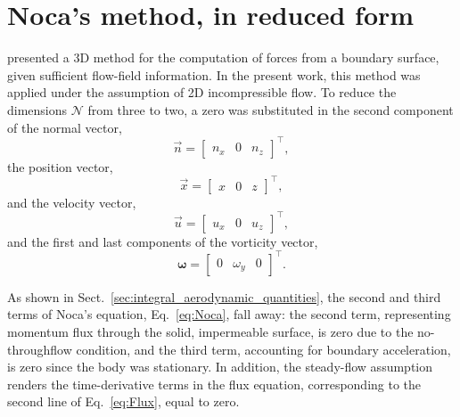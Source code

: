\documentclass[wes, manuscript]{copernicus}
\begin{document}
%
%
\appendix
%
\section{Noca's method, in reduced form}\label{sec:appendix_2D_Noca}
%
\appendixfigures
\appendixtables
%
\cite{Noca1999} presented a 3D method for the computation of forces from a boundary surface, given sufficient flow-field information. In the present work, this method was applied under the assumption of 2D incompressible flow. To reduce the dimensions $\mathscr{N}$ from three to two, a zero was substituted in the second component of the normal vector,
\begin{equation}
\vec{n} = \begin{bmatrix} n_{{x}} & 0 & n_{z} \end{bmatrix}^{\top},
\end{equation}
the position vector,
\begin{equation}
\vec{x} = \begin{bmatrix} x & 0 & z \end{bmatrix}^{\top},
\end{equation}
and the velocity vector,
\begin{equation}
\vec{u} = \begin{bmatrix} u_{{x}} & 0 & u_{{z}} \end{bmatrix}^{\top},
\end{equation}
and the first and last components of the vorticity vector,
\begin{equation}
\boldsymbol{\omega} = \begin{bmatrix} 0 & \omega_{y} & 0 \end{bmatrix}^{\top}.
\end{equation}

As shown in Sect.~\ref{sec:integral_aerodynamic_quantities}, the second and third terms of Noca’s equation, Eq.~\eqref{eq:Noca}, fall away: the second term, representing momentum flux through the solid, impermeable surface, is zero due to the no-throughflow condition, and the third term, accounting for boundary acceleration, is zero since the body was stationary. In addition, the steady-flow assumption renders the time-derivative terms in the flux equation, corresponding to the second line of Eq.~\eqref{eq:Flux}, equal to zero.
\end{document}
